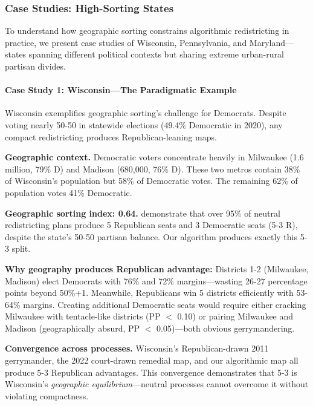 
\subsubsection{Case Studies: High-Sorting States}
\label{sec:case_studies}

To understand how geographic sorting constrains algorithmic redistricting in practice, we present case studies of Wisconsin, Pennsylvania, and Maryland---states spanning different political contexts but sharing extreme urban-rural partisan divides.

\paragraph{Case Study 1: Wisconsin---The Paradigmatic Example}

Wisconsin exemplifies geographic sorting's challenge for Democrats. Despite voting nearly 50-50 in statewide elections (49.4\% Democratic in 2020), any compact redistricting produces Republican-leaning maps.

\textbf{Geographic context.} Democratic voters concentrate heavily in Milwaukee (1.6 million, 79\% D) and Madison (680,000, 76\% D). These two metros contain 38\% of Wisconsin's population but 58\% of Democratic votes. The remaining 62\% of population votes 41\% Democratic.

\textbf{Geographic sorting index: 0.64.} \citet{chen2017impact} demonstrate that over 95\% of neutral redistricting plans produce 5 Republican seats and 3 Democratic seats (5-3 R), despite the state's 50-50 partisan balance. Our algorithm produces exactly this 5-3 split.

\textbf{Why geography produces Republican advantage:} Districts 1-2 (Milwaukee, Madison) elect Democrats with 76\% and 72\% margins---wasting 26-27 percentage points beyond 50\%+1. Meanwhile, Republicans win 5 districts efficiently with 53-64\% margins. Creating additional Democratic seats would require either cracking Milwaukee with tentacle-like districts (PP $<$ 0.10) or pairing Milwaukee and Madison (geographically absurd, PP $<$ 0.05)---both obvious gerrymandering.

\textbf{Convergence across processes.} Wisconsin's Republican-drawn 2011 gerrymander, the 2022 court-drawn remedial map, and our algorithmic map all produce 5-3 Republican advantages. This convergence demonstrates that 5-3 is Wisconsin's \textit{geographic equilibrium}---neutral processes cannot overcome it without violating compactness.

